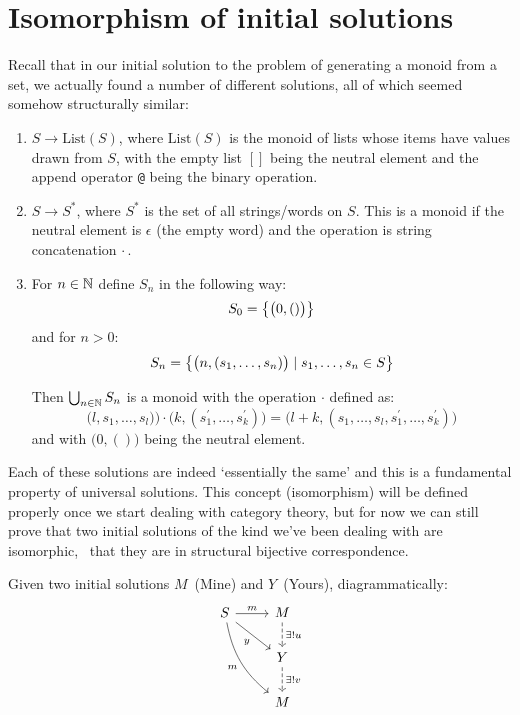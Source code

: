 \section{Isomorphism of initial solutions}

Recall that in our initial solution to the problem of generating a monoid
from a set, we actually found a number of different solutions, all of which
seemed somehow structurally similar:

\begin{enumerate}

\item $S \to \mathrm{List}(S)$, where $\mathrm{List}(S)$ is the monoid of lists
whose items have values drawn from $S$, with the empty list $[]$ being the
neutral element and the append operator \texttt{@} being the binary
operation.

\item $S \to S^\ast$, where $S^\ast$ is the set of all strings/words on $S$.
This is a monoid if the neutral element is $\epsilon$ (the empty word) and the
operation is string concatenation $\cdot$\,.

\item For $n \in \mathbb{N}$ define $S_n$ in the following way:
\[
S_0 = \big\{  \big(0, ()\big)  \big\}
\]
and for $n > 0$:
\[
S_n 
= \big\{ \big(n, (s_1, \ldots, s_n)\big) \mid s_1, \ldots, s_n \in S \big\}
\]

Then $\bigcup_{n\in\mathbb{N}} S_n$ is a monoid with the operation $\cdot$ defined
as: 
\[
\big(l, s_1, \ldots, s_l)\big) 
\cdot 
\big(k, (s_1^\prime, \ldots, s_k^\prime)\big) 
= 
\big(l + k, (s_1, \ldots, s_l, s_1^\prime, \ldots, s_k^\prime)\big)
\]
and with $\big(0, ()\big)$ being the neutral element.

\end{enumerate}

Each of these solutions are indeed `essentially the same' and this is a
fundamental property of universal solutions. This concept (isomorphism)
will be defined properly once we start dealing with category theory, but for
now we can still prove that two initial solutions of the kind we've been
dealing with are isomorphic, \ie~that they are in structural bijective
correspondence.

Given two initial solutions $M$~(Mine) and $Y$~(Yours), diagrammatically:
$$
\begin{tikzcd}
    S \arrow[r, "m"] \arrow[rd, swap, "y"]
    \arrow[rdd, swap, bend right = 20, "m"] & 
    M \arrow[d, dashed, "\exists! u"] \\
    {} & Y \arrow[d, dashed, "\exists! v"] \\
    {} & M
\end{tikzcd}
$$

